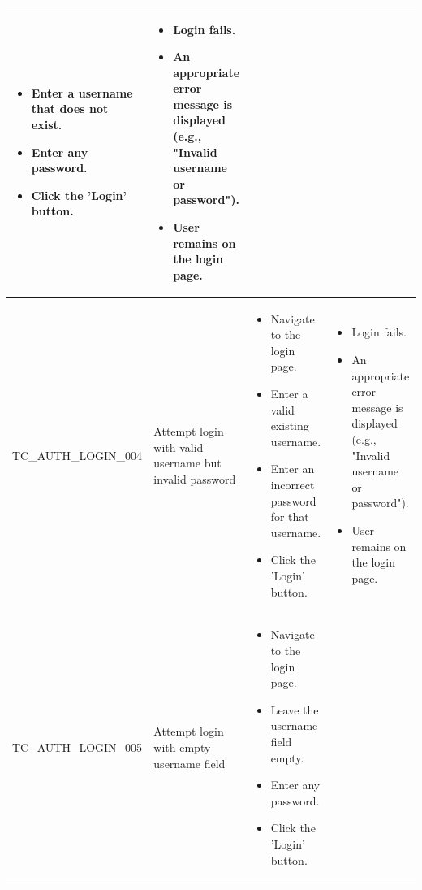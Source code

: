 \documentclass[10pt, a4paper]{report}
\begin{document}
\begin{longtable}{|>{\raggedright\arraybackslash}p{4cm}|>{\raggedright\arraybackslash}p{4cm}|>{\raggedright\arraybackslash}p{5cm}|>{\raggedright\arraybackslash}p{5cm}|}
\begin{itemize}[noitemsep, topsep=0pt, partopsep=0pt, leftmargin=*]
        \item Enter a username that does not exist.
        \item Enter any password.
        \item Click the 'Login' button.
    \end{itemize} & 
    \begin{itemize}[noitemsep, topsep=0pt, partopsep=0pt, leftmargin=*]
        \item Login fails.
        \item An appropriate error message is displayed (e.g., "Invalid username or password").
        \item User remains on the login page.
    \end{itemize} \\ \hline
TC\_AUTH\_LOGIN\_004 & Attempt login with valid username but invalid password & 
    \begin{itemize}[noitemsep, topsep=0pt, partopsep=0pt, leftmargin=*]
        \item Navigate to the login page.
        \item Enter a valid existing username.
        \item Enter an incorrect password for that username.
        \item Click the 'Login' button.
    \end{itemize} & 
    \begin{itemize}[noitemsep, topsep=0pt, partopsep=0pt, leftmargin=*]
        \item Login fails.
        \item An appropriate error message is displayed (e.g., "Invalid username or password").
        \item User remains on the login page.
    \end{itemize} \\ \hline
TC\_AUTH\_LOGIN\_005 & Attempt login with empty username field & 
    \begin{itemize}[noitemsep, topsep=0pt, partopsep=0pt, leftmargin=*]
        \item Navigate to the login page.
        \item Leave the username field empty.
        \item Enter any password.
        \item Click the 'Login' button.
    \end{itemize} & 
    \begin{itemize}[noitemsep, topsep=0pt, partopsep=0pt, leftmargin=*]

\end{itemize}
\end{longtable}
\end{document}
